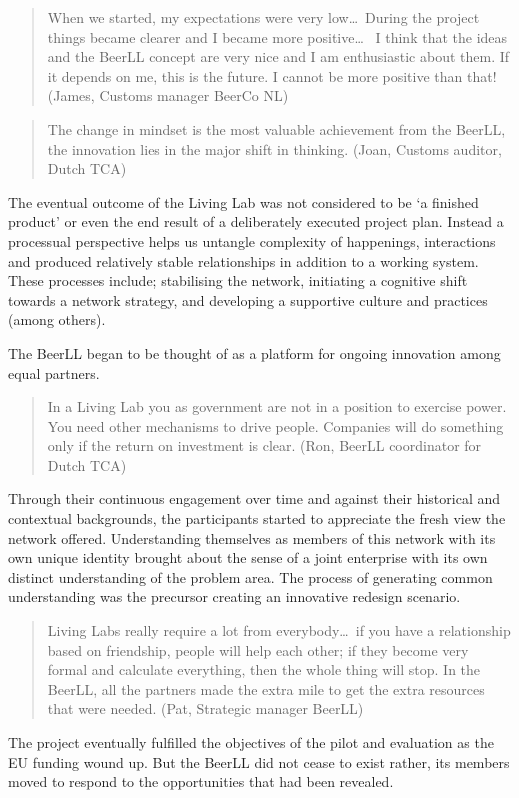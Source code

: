 \documentclass[graybox]{styles/svmult}
\begin{document}
\blockquote{When we started, my expectations were very low\dots~During the project things became clearer and I became more positive\dots~ I think that the ideas and the BeerLL concept are very nice and I am enthusiastic about them. If it depends on me, this is the future. I cannot be more positive than that! (James, Customs manager BeerCo NL) }
 
\blockquote{The change in mindset is the most valuable achievement from the BeerLL, the innovation lies in the major shift in thinking. (Joan, Customs auditor, Dutch TCA)}

The eventual outcome of the Living Lab was not considered to be `a finished product' or even the end result of a deliberately executed project plan. Instead a processual perspective helps us untangle complexity of happenings, interactions and produced relatively stable relationships in addition to a working system. These processes include; stabilising the network, initiating a cognitive shift towards a network strategy, and developing a supportive culture and practices (among others). 

The BeerLL began to be thought of as a platform for ongoing innovation among equal partners. 

\blockquote{In a Living Lab you as government are not in a position to exercise power. You need other mechanisms to drive people. Companies will do something only if the return on investment is clear. (Ron, BeerLL coordinator for Dutch TCA)}

Through their continuous engagement over time and against their historical and contextual backgrounds, the participants started to appreciate the fresh view the network offered. Understanding themselves as members of this network with its own unique identity brought about the sense of a joint enterprise with its own distinct understanding of the problem area. The process of generating common understanding was the precursor creating an innovative redesign scenario. 

\blockquote{Living Labs really require a lot from everybody\dots~if you have a relationship based on friendship, people will help each other; if they become very formal and calculate everything, then the whole thing will stop. In the BeerLL, all the partners made the extra mile to get the extra resources that were needed. (Pat, Strategic manager BeerLL)}

The project eventually fulfilled the objectives of the pilot and evaluation as the EU funding wound up. But the BeerLL did not cease to exist rather, its members moved to respond to the opportunities that had been revealed. 
\end{document}
